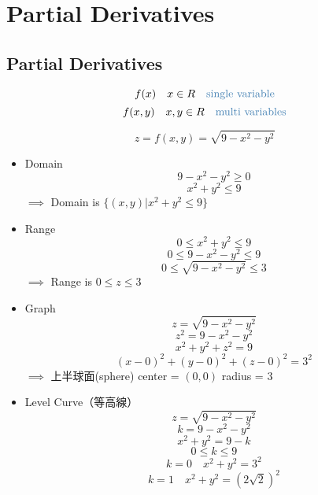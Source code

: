 \graphicspath{{figures/series/}}
\chapter{Partial Derivatives}\label{chap par der}

\section{Partial Derivatives}
\begin{defn}
\[f(x) \quad x \in R \quad \text{\tssteelblue{single variable}}\] 
\[f(x, y) \quad x, y \in R \quad \text{\tssteelblue{multi variables}}\]
\end{defn}
\begin{eg}
\[z = f(x, y) = \sqrt{9 - x^2 - y^2}\]
\begin{itemize}
\item Domain
\[9 - x^2 - y^2 \geq 0\] 
\[x^2 +y^2 \leq 9\]
\(\implies\) Domain is \(\{(x, y) | x^2 + y^2 \leq 9\}\)
\item Range
\[0 \leq x^2 + y^2 \leq 9\] 
\[0 \leq 9 - x^2 - y^2 \leq 9\]
\[0 \leq \sqrt{9 - x^2 - y^2} \leq 3\]
\(\implies\) Range is \(0 \leq z \leq 3\)
\item Graph
\[z = \sqrt{9 - x^2 - y^2}\]
\[z^2 = 9 - x^2 - y^2\]
\[x^2 + y^2 + z^2 = 9\]
\[(x - 0)^2 + (y - 0)^2 + (z - 0)^2 = 3^2\]
\(\implies\) 上半球面(sphere) \quad center = \((0, 0)\) \quad radius = \(3\) 
\item Level Curve（等高線）
\[z = \sqrt{9 - x^2 - y^2}\]
\[k = 9 - x^2 - y^2\]
\[x^2 + y^2 = 9 - k\]
\[0 \leq k \leq 9\]
\[k = 0 \quad x^2 + y^2 = 3^2\]
\[k = 1 \quad x^2 + y^2 = (2 \sqrt{2})^2\]
\end{itemize}
\end{eg}

